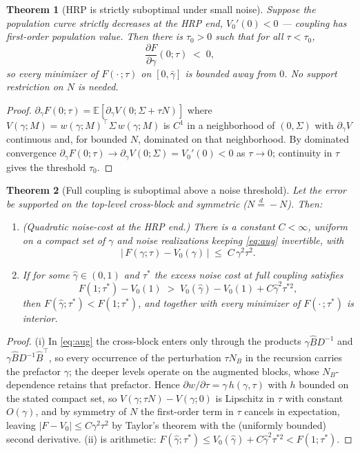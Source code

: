 \documentclass[11pt]{article}
\newtheorem{theorem}{Theorem}
\newcommand{\E}{\mathbb{E}}
\begin{document}
\begin{theorem}[HRP is strictly suboptimal under small noise]
\label{thm:nohrp}
Suppose the population curve strictly decreases at the HRP end,
$V_0'(0) < 0$ --- coupling has first-order population value. Then there is
$\tau_0 > 0$ such that for all $\tau < \tau_0$,
\[
  \frac{\partial F}{\partial\gamma}(0; \tau) \;<\; 0,
\]
so every minimizer of $F(\cdot\,; \tau)$ on $[0, \bar\gamma]$ is bounded away
from $0$. No support restriction on $N$ is needed.
\end{theorem}
\begin{proof}
$\partial_\gamma F(0;\tau) = \E[\partial_\gamma V(0; \Sigma + \tau N)]$ where
$V(\gamma; M) = w(\gamma; M)^\top \Sigma\, w(\gamma; M)$ is $C^1$ in a
neighborhood of $(0, \Sigma)$ with $\partial_\gamma V$ continuous and, for
bounded $N$, dominated on that neighborhood. By dominated convergence
$\partial_\gamma F(0;\tau) \to \partial_\gamma V(0;\Sigma) = V_0'(0) < 0$ as
$\tau \to 0$; continuity in $\tau$ gives the threshold $\tau_0$.
\end{proof}

\begin{theorem}[Full coupling is suboptimal above a noise threshold]
\label{thm:nofull}
Let the error be supported on the top-level cross-block and symmetric
($N \overset{d}{=} -N$). Then:
\begin{enumerate}
\item[\textup{(i)}] \emph{(Quadratic noise-cost at the HRP end.)} There is a
constant $C < \infty$, uniform on a compact set of $\gamma$ and noise
realizations keeping \eqref{eq:aug} invertible, with
\[
  \big|\, F(\gamma; \tau) - V_0(\gamma) \,\big| \;\le\; C\, \gamma^2 \tau^2 .
\]
\item[\textup{(ii)}] If for some $\hat\gamma \in (0, 1)$ and $\tau^*$ the
excess noise cost at full coupling satisfies
\[
  F(1; \tau^*) - V_0(1) \;>\; V_0(\hat\gamma) - V_0(1) + C \hat\gamma^2
  \tau^{*2},
\]
then $F(\hat\gamma; \tau^*) < F(1; \tau^*)$, and together with
 every minimizer of $F(\cdot\,; \tau^*)$ is interior.
\end{enumerate}
\end{theorem}
\begin{proof}
(i) In \eqref{eq:aug} the cross-block enters only through the products
$\gamma \widehat B D^{-1}$ and $\gamma \widehat B D^{-1} \widehat B^\top$, so
every occurrence of the perturbation $\tau N_B$ in the recursion carries the
prefactor $\gamma$; the deeper levels operate on the augmented blocks, whose
$N_B$-dependence retains that prefactor. Hence $\partial w / \partial\tau =
\gamma\, h(\gamma, \tau)$ with $h$ bounded on the stated compact set, so
$V(\gamma; \tau N) - V(\gamma; 0)$ is Lipschitz in $\tau$ with constant
$O(\gamma)$, and by symmetry of $N$ the first-order term in $\tau$ cancels in
expectation, leaving $|F - V_0| \le C\gamma^2\tau^2$ by Taylor's theorem with
the (uniformly bounded) second derivative. (ii) is arithmetic:
$F(\hat\gamma;\tau^*) \le V_0(\hat\gamma) + C\hat\gamma^2\tau^{*2} <
F(1;\tau^*)$.
\end{proof}
\end{document}
